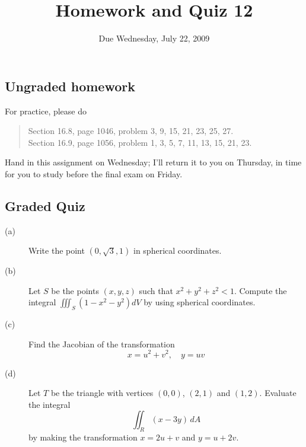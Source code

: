 \documentclass[12pt]{article}
\title{Homework and Quiz 12}
\date{Due Wednesday, July 22, 2009}
\begin{document}
\maketitle

\subsection*{Ungraded homework}

For practice, please do
\begin{quote}
  Section 16.8, page 1046, problem 3, 9, 15, 21, 23, 25, 27. \\
  Section 16.9, page 1056, problem 1, 3, 5, 7, 11, 13, 15, 21, 23.
\end{quote}
Hand in this assignment on Wednesday; I'll return it to you on Thursday, in time for you to study before the final exam on Friday.
\vfill

\subsection*{Graded Quiz}

\begin{description}
\item[(a)] Write the point $(0,\sqrt{3},1)$ in spherical coordinates.
\vfill
\item[(b)] Let $S$ be the points $(x,y,z)$ such that $x^2 + y^2 + z^2 < 1$.  Compute the integral $\displaystyle\iiint_S (1 - x^2 - y^2) dV$ by using spherical coordinates.
\vfill
\item[(c)] Find the Jacobian of the transformation
$$
x = u^2 + v^2, \hspace{1em} y = uv
$$
\vfill
\item[(d)] Let $T$ be the triangle with vertices $(0,0)$, $(2,1)$ and $(1,2)$.  Evaluate the integral
$$
\iint_R (x - 3y) \, dA
$$
by making the transformation $x = 2u + v$ and $y = u + 2v$.
\vfill
\end{description}
\end{document}
